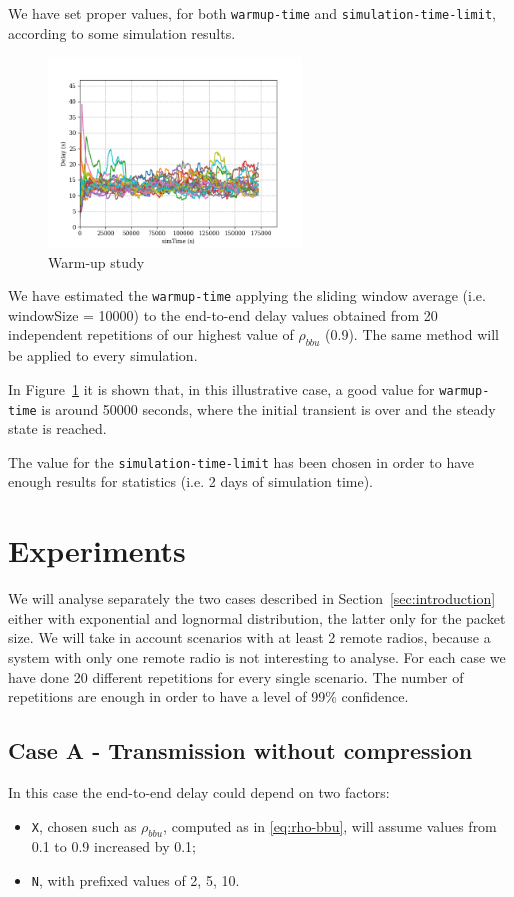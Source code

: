 \documentclass[11pt,a4paper,oneside, openright]{article}
\begin{document}
We have set proper values, for both \texttt{warmup-time} and \texttt{simulation-time-limit}, according to some simulation results.
\begin{figure}[h]
	\centering
	\includegraphics[width=0.6\textwidth]{images/warm-up}
	\caption{Warm-up study}
	\label{fig:warm-up-study}
\end{figure}

We have estimated the \texttt{warmup-time} applying the sliding window average (i.e. windowSize = 10000) to the end-to-end delay values obtained from 20 independent repetitions of our highest value of $ \rho_{bbu} $ (0.9). The same method will be applied to every simulation.

In Figure~\ref{fig:warm-up-study} it is shown that, in this illustrative case, a good value for \texttt{warmup-time} is around 50000 seconds, where the initial transient is over and the steady state is reached. 

The value for the \texttt{simulation-time-limit} has been chosen in order to have enough results for statistics (i.e. 2 days of simulation time).

\section{Experiments}
We will analyse separately the two cases described in Section~\ref{sec:introduction} either with exponential and lognormal distribution, the latter only for the packet size.
We will take in account scenarios with at least 2 remote radios, because a system with only one remote radio is not interesting to analyse. For each case we have done 20 different repetitions for every single scenario.
The number of repetitions are enough in order to have a level of 99\% confidence. 

\subsection{Case A - Transmission without compression}
In this case the end-to-end delay could depend on two factors:
\begin{itemize}
	\item \texttt{X}, chosen such as $ \rho_{bbu} $, computed as in \ref{eq:rho-bbu}, will assume values from 0.1 to 0.9 increased by 0.1;
	\item \texttt{N}, with prefixed values of 2, 5, 10.
\end{itemize}
\end{document}
